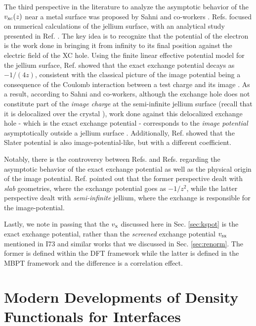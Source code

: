 \documentclass[aip, amsmath, amssymb, reprint, longbibliography]{revtex4-2}
\begin{document}
The third perspective in the literature to analyze the asymptotic behavior of the $v_{\rm xc}(z)$ near a metal surface was proposed by Sahni and co-workers \cite{HS89a,HS89b,SS96}. Refs.  focused on numerical calculations of the jellium surface, with an analytical study presented in Ref. . The key idea is to recognize that the potential of the electron is the work done in bringing it from infinity to its final position against the electric field of the XC hole. Using the finite linear effective potential model for the jellium surface, Ref.  showed that the exact exchange potential decays as $-1/(4z)$, consistent with the classical picture of the image potential being a consequence of the Coulomb interaction between a test charge and its image \cite{LK73}. As a result, according to Sahni and co-workers, although the exchange hole does not constitute part of the \emph{image charge} at the semi-infinite jellium surface (recall that it is delocalized over the crystal \cite{HS88}), work done against this delocalized exchange hole  - which is the exact exchange potential - corresponds to the \emph{image potential} asymptotically outside a jellium surface \cite{HS89a}. Additionally, Ref.  showed that the Slater potential \cite{S51} is also image-potential-like, but with a different coefficient. 

Notably, there is the controversy between Refs.  and Refs.   regarding the asymptotic behavior of the exact exchange potential as well as the physical origin of the image potential. Ref.  pointed out that the former perspective dealt with \emph{slab} geometries, where the exchange potential goes as $-1/z^2$, while the latter perspective dealt with \emph{semi-infinite} jellium, where the exchange is responsible for the image-potential. 

Lastly, we note in passing that the $v_{\rm x}$ discussed here in Sec. \ref{sec:kspot} is the exact exchange potential, rather than the \emph{screened} exchange potential $v_{\rm sx}$ mentioned in I73 \cite{I73} and similar works that we discussed in Sec. \ref{sec:renorm}. The former is defined within the DFT framework while the latter is defined in the MBPT framework and the difference is a correlation effect.

\section{Modern Developments of Density Functionals for Interfaces}
\label{sec:func}
\end{document}
